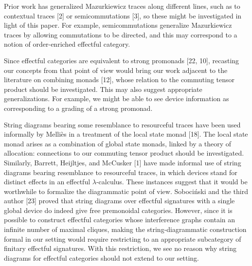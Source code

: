 \documentclass[10pt,a4paper]{article}
\begin{document}
 
 
Prior work has generalized Mazurkiewicz traces along different lines, such as to contextual traces [2] or semicommutations [3], so these might be investigated in light of this paper. For example, semicommutations generalize Mazurkiewicz traces by allowing commutations to be directed, and this may correspond to a notion of order-enriched effectful category.\par
 
 
 
Since effectful categories are equivalent to strong promonads [22, 10], recasting our concepts from that point of view would bring our work adjacent to the literature on combining monads [12], whose relation to the commuting tensor product should be investigated. This may also suggest appropriate generalizations. For example, we might be able to see device information as corresponding to a grading of a strong promonad.\par
 
 
 
String diagrams bearing some resemblance to resourceful traces have been used informally by Melliès in a treatment of the local state monad [18]. The local state monad arises as a combination of global state monads, linked by a theory of allocation: connections to our commuting tensor product should be investigated. Similarly, Barrett, Heijltjes, and McCusker [1] have made informal use of string diagrams bearing resemblance to resourceful traces, in which devices stand for distinct effects in an effectful $\lambda$-calculus. These instances suggest that it would be worthwhile to formalize the diagrammatic point of view. Sobociński and the third author [23] proved that string diagrams over effectful signatures with a single global device do indeed give free premonoidal categories. However, since it is possible to construct effectful categories whose interference graphs contain an infinite number of maximal cliques, making the string-diagrammatic construction formal in our setting would require restricting to an appropriate subcategory of finitary effectful signatures. With this restriction, we see no reason why string diagrams for effectful categories should not extend to our setting.\par
 
 
\end{document}
